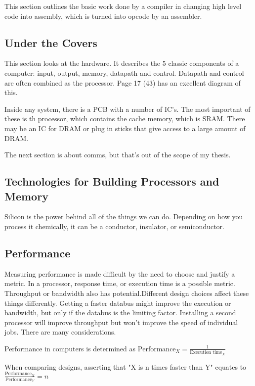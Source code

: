 \documentclass{article}
\begin{document}
			This section outlines the basic work done by a compiler in changing high level code into assembly, which is turned into opcode by an assembler.
		\subsection{Under the Covers}
			This section looks at the hardware. It describes the 5 classic components of a computer: input, output, memory, datapath and control. Datapath and control are often combined as the processor. Page 17 (43) has an excellent diagram of this.
			
			Inside any system, there is a PCB with a number of IC's. The most important of these is th processor, which contains the cache memory, which is SRAM. There may be an IC for DRAM or plug in sticks that give access to a large amount of DRAM.
			
			The next section is about comms, but that's out of the scope of my thesis.
		\subsection{Technologies for Building Processors and Memory}
			Silicon is the power behind all of the things we can do. Depending on how you process it chemically, it can be a conductor, insulator, or semiconductor. 
		\subsection{Performance}
			Measuring performance is made difficult by the need to choose and justify a metric. In a processor, response time, or execution time is a possible metric. Throughput or bandwidth also has potential.Different design choices affect these things differently. Getting a faster databus might improve the execution or bandwidth, but only if the databus is the limiting factor. Installing a second processor will improve throughput but won't improve the speed of individual jobs. There are many considerations.
			
			Performance in computers is determined as $\text{Performance}_{X} = \frac{1}{\text{Execution time}_{X}}$
			
			When comparing designs, asserting that "X is n times faster than Y" equates to $\frac{\text{Performance}_{X}}{\text{Performance}_{Y}} = n$
			
\end{document}
